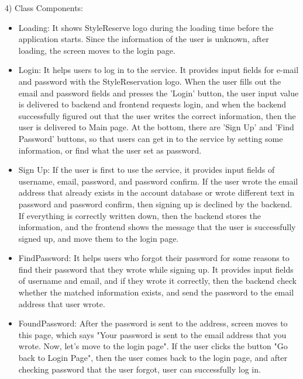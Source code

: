 \documentclass[conference]{IEEEtran}
\begin{document}
4) Class Components:
\begin{itemize}
    \item Loading: It shows StyleReserve logo during the loading time before the application starts. Since the information of the user is unknown, after loading, the screen moves to the login page.\\
    
    \item Login: It helps users to log in to the service. It provides input fields for e-mail and password with the StyleReservation logo. When the user fills out the email and password fields and presses the ’Login’ button, the user input value is delivered to backend and frontend requests login, and when the backend successfully figured out that the user writes the correct information, then the user is delivered to Main page. At the bottom, there are 'Sign Up' and 'Find Password' buttons, so that users can get in to the service by setting some information, or find what the user set as password.\\
    
    \item Sign Up: If the user is first to use the service, it provides input fields of username, email, password, and password confirm. If the user wrote the email address that already exists in the account database or wrote different text in password and password confirm, then signing up is declined by the backend. If everything is correctly written down, then the backend stores the information, and the frontend shows the message that the user is successfully signed up, and move them to the login page.\\
    
    \item FindPassword: It helps users who forgot their password for some reasons to find their password that they wrote while signing up. It provides input fields of username and email, and if they wrote it correctly, then the backend check whether the matched information exists, and send the password to the email address that user wrote.\\
    
    \item FoundPassword: After the password is sent to the address, screen moves to this page, which says "Your password is sent to the email address that you wrote. Now, let's move to the login page". If the user clicks the button "Go back to Login Page", then the user comes back to the login page, and after checking password that the user forgot, user can successfully log in.\\
    

\end{itemize}
\end{document}
